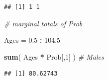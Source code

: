 \documentclass[]{book}
\newenvironment{Shaded}{\begin{snugshade}}{\end{snugshade}}
\newcommand{\CommentTok}[1]{\textcolor[rgb]{0.56,0.35,0.01}{\textit{#1}}}
\newcommand{\DecValTok}[1]{\textcolor[rgb]{0.00,0.00,0.81}{#1}}
\newcommand{\FloatTok}[1]{\textcolor[rgb]{0.00,0.00,0.81}{#1}}
\newcommand{\KeywordTok}[1]{\textcolor[rgb]{0.13,0.29,0.53}{\textbf{#1}}}
\newcommand{\NormalTok}[1]{#1}
\newcommand{\OperatorTok}[1]{\textcolor[rgb]{0.81,0.36,0.00}{\textbf{#1}}}
\newcommand{\StringTok}[1]{\textcolor[rgb]{0.31,0.60,0.02}{#1}}
\begin{document}
\begin{verbatim}
## [1] 1 1
\end{verbatim}

\begin{Shaded}
\begin{Highlighting}[]
      \CommentTok{# marginal totals of Prob}
      
\NormalTok{Ages =}\StringTok{ }\FloatTok{0.5} \OperatorTok{:}\StringTok{ }\FloatTok{104.5}

\KeywordTok{sum}\NormalTok{( Ages }\OperatorTok{*}\StringTok{ }\NormalTok{Prob[,}\DecValTok{1}\NormalTok{] ) }\CommentTok{# Males}
\end{Highlighting}
\end{Shaded}

\begin{verbatim}
## [1] 80.62743
\end{verbatim}
\end{document}

